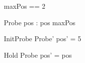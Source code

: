\documentclass{article}
\begin{document}
\begin{zed}
  maxPos == 2
\end{zed}
\begin{schema}{Probe}
  pos : \nat
\where
  pos \leq maxPos
\end{schema}
\begin{schema}{InitProbe}
  Probe'
\where
  pos' = 5
\end{schema}
\begin{schema}{Hold}
  \Delta Probe
\where
  pos' = pos
\end{schema}
\end{document}
